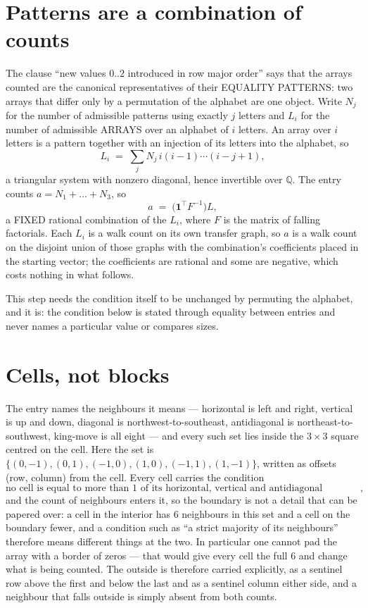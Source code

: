 \documentclass[11pt,a4paper]{article}
\theoremstyle{plain}
\theoremstyle{definition}
\begin{document}
\section{Patterns are a combination of counts}

The clause ``new values $0..2$ introduced in row major order'' says that the arrays
counted are the canonical representatives of their EQUALITY PATTERNS: two arrays that differ
only by a permutation of the alphabet are one object. Write $N_j$ for the number of admissible
patterns using exactly $j$ letters and $L_i$ for the number of admissible ARRAYS over an
alphabet of $i$ letters. An array over $i$ letters is a pattern together with an injection of
its letters into the alphabet, so
\[
L_i\;=\;\sum_{j}N_j\,i(i-1)\cdots(i-j+1),
\]
a triangular system with nonzero diagonal, hence invertible over $\mathbb{Q}$. The entry
counts $a=N_1+\dots+N_{3}$, so
\[
a\;=\;\bigl(\mathbf{1}^{\!\top}F^{-1}\bigr)L ,
\]
a FIXED rational combination of the $L_i$, where $F$ is the matrix of falling factorials.
Each $L_i$ is a walk count on its own transfer graph, so $a$ is a walk count on the disjoint
union of those graphs with the combination's coefficients placed in the starting vector; the
coefficients are rational and some are negative, which costs nothing in what follows.

This step needs the condition itself to be unchanged by permuting the alphabet, and it is:
the condition below is stated through equality between entries and never names a particular
value or compares sizes.

\section{Cells, not blocks}

The entry names the neighbours it means --- horizontal is left and right, vertical is up and
down, diagonal is northwest-to-southeast, antidiagonal is northeast-to-southwest, king-move is
all eight --- and every such set lies inside the $3\times3$ square centred on the cell. Here
the set is $\{(0,-1), (0,1), (-1,0), (1,0), (-1,1), (1,-1)\}$, written as offsets (row, column) from the cell. Every cell carries
the condition
\[
\text{no cell is equal to more than 1 of its horizontal, vertical and antidiagonal neighbours},
\]
and the count of neighbours enters it, so the boundary is not a detail that can be papered
over: a cell in the interior has $6$ neighbours in this set and a cell on the boundary
fewer, and a condition such as ``a strict majority of its neighbours'' therefore means
different things at the two. In particular one cannot pad the array with a border of zeros ---
that would give every cell the full $6$ and change what is being counted. The outside is
therefore carried
explicitly, as a sentinel row above the first and below the last and as a sentinel column
either side, and a neighbour that falls outside is simply absent from both counts.
\end{document}
